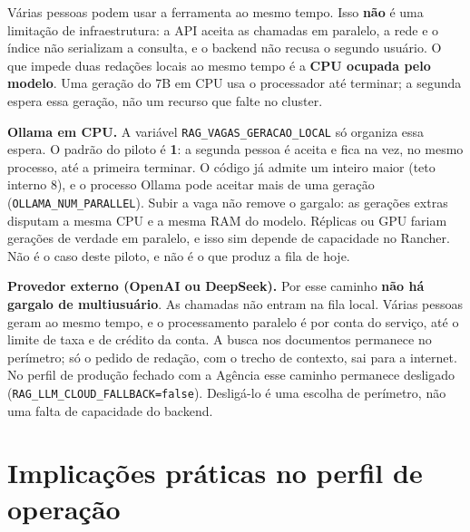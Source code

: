 \documentclass[12pt, a4paper]{article}
\begin{document}
Várias pessoas podem usar a ferramenta ao mesmo tempo. Isso \textbf{não} é uma limitação de infraestrutura: a API aceita as chamadas em paralelo, a rede e o índice não serializam a consulta, e o backend não recusa o segundo usuário. O que impede duas redações locais ao mesmo tempo é a \textbf{CPU ocupada pelo modelo}. Uma geração do 7B em CPU usa o processador até terminar; a segunda espera essa geração, não um recurso que falte no cluster.

\textbf{Ollama em CPU.} A variável \texttt{RAG\_VAGAS\_GERACAO\_LOCAL} só organiza essa espera. O padrão do piloto é \textbf{1}: a segunda pessoa é aceita e fica na vez, no mesmo processo, até a primeira terminar. O código já admite um inteiro maior (teto interno 8), e o processo Ollama pode aceitar mais de uma geração (\texttt{OLLAMA\_NUM\_PARALLEL}). Subir a vaga não remove o gargalo: as gerações extras disputam a mesma CPU e a mesma RAM do modelo. Réplicas ou GPU fariam gerações de verdade em paralelo, e isso sim depende de capacidade no Rancher. Não é o caso deste piloto, e não é o que produz a fila de hoje.

\textbf{Provedor externo (OpenAI ou DeepSeek).} Por esse caminho \textbf{não há gargalo de multiusuário}. As chamadas não entram na fila local. Várias pessoas geram ao mesmo tempo, e o processamento paralelo é por conta do serviço, até o limite de taxa e de crédito da conta. A busca nos documentos permanece no perímetro; só o pedido de redação, com o trecho de contexto, sai para a internet. No perfil de produção fechado com a Agência esse caminho permanece desligado (\texttt{RAG\_LLM\_CLOUD\_FALLBACK=false}). Desligá-lo é uma escolha de perímetro, não uma falta de capacidade do backend.

\section{Implicações práticas no perfil de operação}
\end{document}
